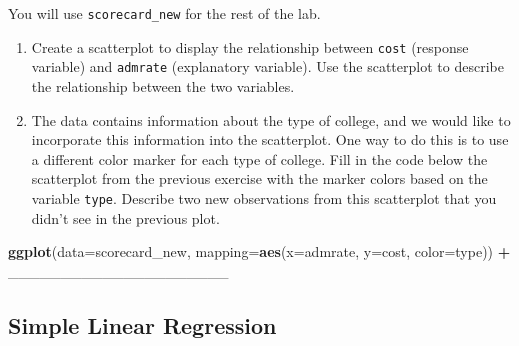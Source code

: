 \documentclass[]{book}
\newenvironment{Shaded}{\begin{snugshade}}{\end{snugshade}}
\newcommand{\KeywordTok}[1]{\textcolor[rgb]{0.13,0.29,0.53}{\textbf{#1}}}
\newcommand{\DataTypeTok}[1]{\textcolor[rgb]{0.13,0.29,0.53}{#1}}
\newcommand{\StringTok}[1]{\textcolor[rgb]{0.31,0.60,0.02}{#1}}
\newcommand{\OperatorTok}[1]{\textcolor[rgb]{0.81,0.36,0.00}{\textbf{#1}}}
\newcommand{\NormalTok}[1]{#1}
\begin{document}
You will use \texttt{scorecard\_new} for the rest of the lab.

\begin{enumerate}
\def\labelenumi{\arabic{enumi}.}
\setcounter{enumi}{5}
\item
  Create a scatterplot to display the relationship between \texttt{cost}
  (response variable) and \texttt{admrate} (explanatory variable). Use
  the scatterplot to describe the relationship between the two
  variables.
\item
  The data contains information about the type of college, and we would
  like to incorporate this information into the scatterplot. One way to
  do this is to use a different color marker for each type of college.
  Fill in the code below the scatterplot from the previous exercise with
  the marker colors based on the variable \texttt{type}. Describe two
  new observations from this scatterplot that you didn't see in the
  previous plot.
\end{enumerate}

\begin{Shaded}
\begin{Highlighting}[]
\KeywordTok{ggplot}\NormalTok{(}\DataTypeTok{data=}\NormalTok{scorecard_new, }\DataTypeTok{mapping=}\KeywordTok{aes}\NormalTok{(}\DataTypeTok{x=}\NormalTok{admrate, }\DataTypeTok{y=}\NormalTok{cost, }\DataTypeTok{color=}\NormalTok{type)) }\OperatorTok{+}\StringTok{ }
\StringTok{  }\NormalTok{_____________________}
\end{Highlighting}
\end{Shaded}

\subsection{Simple Linear Regression}\label{simple-linear-regression-1}
\end{document}
